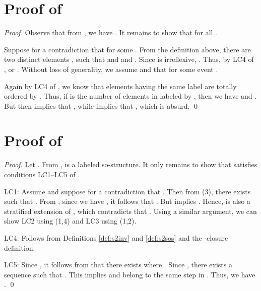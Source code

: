 \documentclass{llncs}
\begin{document}
\section{Proof of }
\begin{proof} Observe that from , we have . It remains to show that   for all . 

Suppose for a contradiction that  for some . From the definition above, there are two distinct elements , such that  and  and . Since  is irreflexive, . Thus, by \textsf{LC4} of ,  or . Without loss of generality, we assume  and that  for some event . 

Again by \textsf{LC4} of , we know that elements  having the same label are totally ordered by . Thus, if  is the number of elements in  labeled by , then we have  and  . But then   implies that , while  implies that , which is absurd. \qed
\end{proof}

\section{Proof of }
\begin{proof} Let . From ,  is a labeled so-structure. It only remains to show that  satisfies conditions \textsf{LC1}--\textsf{LC5} of . 

\textsf{LC1}: Assume   and suppose for a contradiction that . Then from  (3), there exists  such that . From , since we have , it follows that . But   implies . Hence,   is also a stratified extension of , which contradicts that . Using a similar argument, we can show \textsf{LC2} using  (1,4) and \textsf{LC3} using  (1,2).  

\textsf{LC4}: Follows from Definitions \ref{def:s2inv} and \ref{def:s2sos} and the -closure definition.

\textsf{LC5}: Since ,  it follows from  that there exists  where . Since , there exists a sequence  such that . This implies  and  belong to the same step in  . Thus, we have . \qed
\end{proof}
\end{document}
